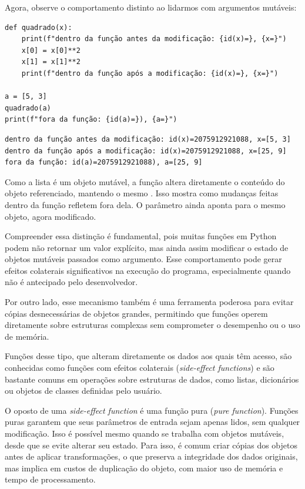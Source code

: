 Agora, observe o comportamento distinto ao lidarmos com argumentos mutáveis:
\begin{verbatim}
def quadrado(x):
    print(f"dentro da função antes da modificação: {id(x)=}, {x=}")
    x[0] = x[0]**2
    x[1] = x[1]**2
    print(f"dentro da função após a modificação: {id(x)=}, {x=}")

a = [5, 3]
quadrado(a)
print(f"fora da função: {id(a)=}), {a=}")
\end{verbatim}
\begin{verbatim}
dentro da função antes da modificação: id(x)=2075912921088, x=[5, 3]
dentro da função após a modificação: id(x)=2075912921088, x=[25, 9]
fora da função: id(a)=2075912921088), a=[25, 9]
\end{verbatim}

Como a lista é um objeto mutável, a função altera diretamente o conteúdo do objeto referenciado,
mantendo o mesmo .
Isso mostra como mudanças feitas dentro da função refletem fora dela. O parâmetro ainda aponta para o mesmo objeto,
agora modificado.


Compreender essa distinção é fundamental, pois muitas funções em Python podem não retornar um valor explícito, mas
ainda assim modificar o estado de objetos mutáveis passados como argumento.
Esse comportamento pode gerar efeitos colaterais significativos na execução do programa, especialmente quando
não é antecipado pelo desenvolvedor.


Por outro lado, esse mecanismo também é uma ferramenta poderosa para evitar cópias desnecessárias de objetos grandes,
permitindo que funções operem diretamente sobre estruturas complexas sem comprometer o desempenho ou o uso de memória.


Funções desse tipo, que alteram diretamente os dados aos quais têm acesso, são conhecidas como funções com efeitos colaterais (\emph{side-effect functions}) e são bastante comuns em operações sobre estruturas de dados, como listas, dicionários ou objetos de classes definidas pelo usuário.


O oposto de uma \emph{side-effect function} é uma função pura (\emph{pure function}). Funções puras garantem que seus parâmetros de entrada sejam apenas lidos, sem qualquer modificação. Isso é possível mesmo quando se trabalha com objetos mutáveis, desde que se evite alterar seu estado. Para isso, é comum criar cópias dos objetos antes de aplicar transformações, o que preserva a integridade dos dados originais, mas implica em custos de duplicação do objeto, com maior uso de memória e tempo de processamento.

